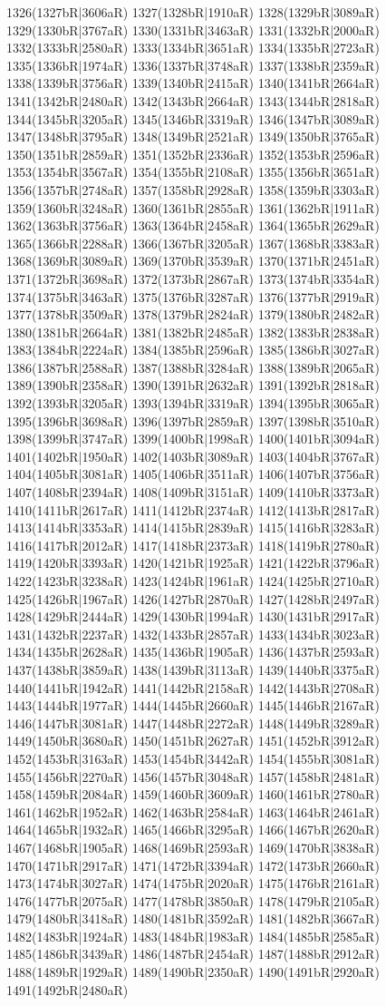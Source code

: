 1326(1327bR|3606aR) 1327(1328bR|1910aR) 1328(1329bR|3089aR) 1329(1330bR|3767aR) 1330(1331bR|3463aR) 1331(1332bR|2000aR) 1332(1333bR|2580aR) 1333(1334bR|3651aR) 1334(1335bR|2723aR) 1335(1336bR|1974aR) 1336(1337bR|3748aR) 1337(1338bR|2359aR) 1338(1339bR|3756aR) 1339(1340bR|2415aR) 1340(1341bR|2664aR) 1341(1342bR|2480aR) 1342(1343bR|2664aR) 1343(1344bR|2818aR) 1344(1345bR|3205aR) 1345(1346bR|3319aR) 1346(1347bR|3089aR) 1347(1348bR|3795aR) 1348(1349bR|2521aR) 1349(1350bR|3765aR) 1350(1351bR|2859aR) 1351(1352bR|2336aR) 1352(1353bR|2596aR) 1353(1354bR|3567aR) 1354(1355bR|2108aR) 1355(1356bR|3651aR) 1356(1357bR|2748aR) 1357(1358bR|2928aR) 1358(1359bR|3303aR) 1359(1360bR|3248aR) 1360(1361bR|2855aR) 1361(1362bR|1911aR) 1362(1363bR|3756aR) 1363(1364bR|2458aR) 1364(1365bR|2629aR) 1365(1366bR|2288aR) 1366(1367bR|3205aR) 1367(1368bR|3383aR) 1368(1369bR|3089aR) 1369(1370bR|3539aR) 1370(1371bR|2451aR) 1371(1372bR|3698aR) 1372(1373bR|2867aR) 1373(1374bR|3354aR) 1374(1375bR|3463aR) 1375(1376bR|3287aR) 1376(1377bR|2919aR) 1377(1378bR|3509aR) 1378(1379bR|2824aR) 1379(1380bR|2482aR) 1380(1381bR|2664aR) 1381(1382bR|2485aR) 1382(1383bR|2838aR) 1383(1384bR|2224aR) 1384(1385bR|2596aR) 1385(1386bR|3027aR) 1386(1387bR|2588aR) 1387(1388bR|3284aR) 1388(1389bR|2065aR) 1389(1390bR|2358aR) 1390(1391bR|2632aR) 1391(1392bR|2818aR) 1392(1393bR|3205aR) 1393(1394bR|3319aR) 1394(1395bR|3065aR) 1395(1396bR|3698aR) 1396(1397bR|2859aR) 1397(1398bR|3510aR) 1398(1399bR|3747aR) 1399(1400bR|1998aR) 1400(1401bR|3094aR) 1401(1402bR|1950aR) 1402(1403bR|3089aR) 1403(1404bR|3767aR) 1404(1405bR|3081aR) 1405(1406bR|3511aR) 1406(1407bR|3756aR) 1407(1408bR|2394aR) 1408(1409bR|3151aR) 1409(1410bR|3373aR) 1410(1411bR|2617aR) 1411(1412bR|2374aR) 1412(1413bR|2817aR) 1413(1414bR|3353aR) 1414(1415bR|2839aR) 1415(1416bR|3283aR) 1416(1417bR|2012aR) 1417(1418bR|2373aR) 1418(1419bR|2780aR) 1419(1420bR|3393aR) 1420(1421bR|1925aR) 1421(1422bR|3796aR) 1422(1423bR|3238aR) 1423(1424bR|1961aR) 1424(1425bR|2710aR) 1425(1426bR|1967aR) 1426(1427bR|2870aR) 1427(1428bR|2497aR) 1428(1429bR|2444aR) 1429(1430bR|1994aR) 1430(1431bR|2917aR) 1431(1432bR|2237aR) 1432(1433bR|2857aR) 1433(1434bR|3023aR) 1434(1435bR|2628aR) 1435(1436bR|1905aR) 1436(1437bR|2593aR) 1437(1438bR|3859aR) 1438(1439bR|3113aR) 1439(1440bR|3375aR) 1440(1441bR|1942aR) 1441(1442bR|2158aR) 1442(1443bR|2708aR) 1443(1444bR|1977aR) 1444(1445bR|2660aR) 1445(1446bR|2167aR) 1446(1447bR|3081aR) 1447(1448bR|2272aR) 1448(1449bR|3289aR) 1449(1450bR|3680aR) 1450(1451bR|2627aR) 1451(1452bR|3912aR) 1452(1453bR|3163aR) 1453(1454bR|3442aR) 1454(1455bR|3081aR) 1455(1456bR|2270aR) 1456(1457bR|3048aR) 1457(1458bR|2481aR) 1458(1459bR|2084aR) 1459(1460bR|3609aR) 1460(1461bR|2780aR) 1461(1462bR|1952aR) 1462(1463bR|2584aR) 1463(1464bR|2461aR) 1464(1465bR|1932aR) 1465(1466bR|3295aR) 1466(1467bR|2620aR) 1467(1468bR|1905aR) 1468(1469bR|2593aR) 1469(1470bR|3838aR) 1470(1471bR|2917aR) 1471(1472bR|3394aR) 1472(1473bR|2660aR) 1473(1474bR|3027aR) 1474(1475bR|2020aR) 1475(1476bR|2161aR) 1476(1477bR|2075aR) 1477(1478bR|3850aR) 1478(1479bR|2105aR) 1479(1480bR|3418aR) 1480(1481bR|3592aR) 1481(1482bR|3667aR) 1482(1483bR|1924aR) 1483(1484bR|1983aR) 1484(1485bR|2585aR) 1485(1486bR|3439aR) 1486(1487bR|2454aR) 1487(1488bR|2912aR) 1488(1489bR|1929aR) 1489(1490bR|2350aR) 1490(1491bR|2920aR) 1491(1492bR|2480aR) 